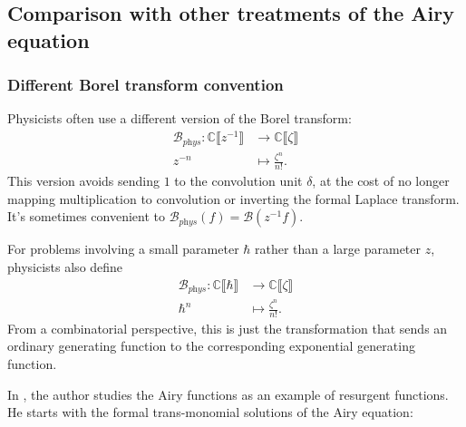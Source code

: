 \documentclass{article}
\theoremstyle{definition}
\newcommand{\maps}{\colon}
\newcommand{\C}{\mathbb{C}}
\newcommand{\borel}{\mathcal{B}}
\begin{document}
\subsection{Comparison with other treatments of the Airy equation}

\subsubsection{Different Borel transform convention} Physicists often use a different version of the Borel transform:
\begin{align*}
\borel_{\textit{phys}} \maps \C \llbracket z^{-1} \rrbracket & \to \C \llbracket \zeta \rrbracket \\
z^{-n} & \mapsto \frac{\zeta^n}{n!}.
\end{align*}
This version avoids sending $1$ to the convolution unit $\delta$, at the cost of no longer mapping multiplication to convolution or inverting the formal Laplace transform. It's sometimes convenient to $\borel_\textit{phys}(f) = \borel(z^{-1} f)$.

For problems involving a small parameter $\hbar$ rather than a large parameter $z$, physicists also define
\begin{align*}
\borel_{\textit{phys}} \maps \C \llbracket \hbar \rrbracket & \to \C \llbracket \zeta \rrbracket \\
\hbar^n & \mapsto \frac{\zeta^n}{n!}.
\end{align*}
From a combinatorial perspective, this is just the transformation that sends an ordinary generating function to the corresponding exponential generating function.

In \cite{lectures-Marino}, the author studies the Airy functions as an example of resurgent functions. He starts with the formal trans-monomial solutions of the Airy equation:
\end{document}

